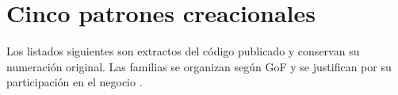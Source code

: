 \section{Cinco patrones creacionales}
Los listados siguientes son extractos del código publicado y conservan su numeración original. Las familias se organizan según GoF y se justifican por su participación en el negocio \cite{gof}.







